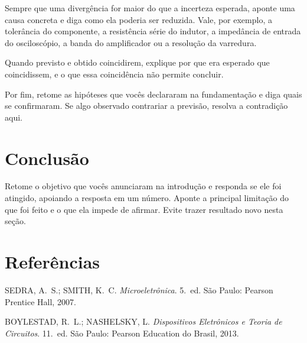 \documentclass[11pt,a4paper]{article}
\begin{document}
Sempre que uma divergência for maior do que a incerteza esperada, aponte uma causa concreta
e diga como ela poderia ser reduzida. Vale, por exemplo, a tolerância do componente, a
resistência série do indutor, a impedância de entrada do osciloscópio, a banda do
amplificador ou a resolução da varredura.

Quando previsto e obtido coincidirem, explique por que era esperado que coincidissem, e o
que essa coincidência não permite concluir.

Por fim, retome as hipóteses que vocês declararam na fundamentação e diga quais se
confirmaram. Se algo observado contrariar a previsão, resolva a contradição aqui.

\section{Conclusão}

Retome o objetivo que vocês anunciaram na introdução e responda se ele foi atingido,
apoiando a resposta em um número. Aponte a principal limitação do que foi feito e o que
ela impede de afirmar. Evite trazer resultado novo nesta seção.

\section{Referências}

\begin{referencias}
\item SEDRA, A.~S.; SMITH, K.~C. \emph{Microeletrônica}. 5.~ed. São Paulo: Pearson
      Prentice Hall, 2007.
\item BOYLESTAD, R.~L.; NASHELSKY, L. \emph{Dispositivos Eletrônicos e Teoria de
      Circuitos}. 11.~ed. São Paulo: Pearson Education do Brasil, 2013.
\end{referencias}
\end{document}
